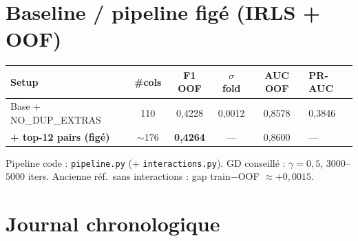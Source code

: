 \documentclass[11pt,a4paper]{article}
\begin{document}
\section{Baseline / pipeline figé (IRLS + OOF)}
\begin{center}
\begin{tabular}{@{}lcccc@{}}
\toprule
Setup & \#cols & F1 OOF & $\sigma$ fold & AUC OOF & PR-AUC \\
\midrule
Base + NO\_DUP\_EXTRAS & 110 & 0{,}4228 & 0{,}0012 & 0{,}8578 & 0{,}3846 \\
\textbf{+ top-12 pairs (figé)} & $\sim$176 & \textbf{0{,}4264} & --- & 0{,}8600 & --- \\
\bottomrule
\end{tabular}
\end{center}
\noindent Pipeline code : \texttt{pipeline.py} (+ \texttt{interactions.py}).
GD conseillé : $\gamma=0{,}5$, $3000$--$5000$ iters.
Ancienne réf.\ sans interactions : gap train$-$OOF $\approx +0{,}0015$.

\section{Journal chronologique}
\end{document}
